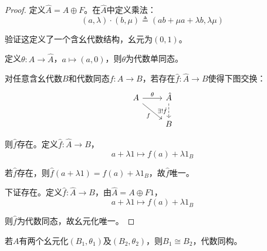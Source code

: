\documentclass[lang=cn,a4paper,newtx,section]{elegantbook}
\begin{document}
\begin{proof}
  定义$\hat{A} = A \oplus F$。在$\hat{A}$中定义乘法：
  \begin{equation*}
    (a, \lambda) \cdot (b, \mu) \triangleq (ab + \mu a + \lambda b, \lambda \mu)
  \end{equation*}
  
  验证这定义了一个含幺代数结构，幺元为$(0, 1)$。
  
  定义$\theta: A \to \hat{A}$，$a \mapsto (a, 0)$，则$\theta$为代数单同态。
  
  对任意含幺代数$B$和代数同态$f: A \to B$，若存在$\hat{f}: \hat{A} \to B$使得下图交换：
  \begin{equation*}
    \begin{tikzcd}
      A \arrow[r, "\theta"] \arrow[dr, "f"'] & \hat{A} \arrow[d, "\exists! \hat{f}"', dashed] \\
      & B
    \end{tikzcd}
  \end{equation*}
  
  则$\hat{f}$存在。定义$\hat{f}: \hat{A} \to B$，
  \begin{equation*}
    a + \lambda 1 \mapsto f(a) + \lambda 1_B
  \end{equation*}
  
  若$\hat{f}$存在，则$\hat{f}(a + \lambda 1) = f(a) + \lambda 1_B$，故$\hat{f}$唯一。
  
  下证存在。定义$\hat{f}: \hat{A} \to B$，由$\hat{A} = A \oplus F1$，
  \begin{equation*}
    a + \lambda 1 \mapsto f(a) + \lambda 1_B
  \end{equation*}
  
  则$\hat{f}$为代数同态，故幺元化唯一。
\end{proof}

\begin{proposition}[幺元化唯一性]
  若$A$有两个幺元化$(B_1, \theta_1)$及$(B_2, \theta_2)$，则$B_1 \cong B_2$，代数同构。
\end{proposition}
\end{document}

